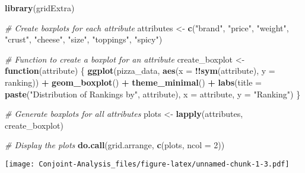 \documentclass[
]{article}
\newenvironment{Shaded}{\begin{snugshade}}{\end{snugshade}}
\newcommand{\AttributeTok}[1]{\textcolor[rgb]{0.13,0.29,0.53}{#1}}
\newcommand{\CommentTok}[1]{\textcolor[rgb]{0.56,0.35,0.01}{\textit{#1}}}
\newcommand{\ControlFlowTok}[1]{\textcolor[rgb]{0.13,0.29,0.53}{\textbf{#1}}}
\newcommand{\DecValTok}[1]{\textcolor[rgb]{0.00,0.00,0.81}{#1}}
\newcommand{\FunctionTok}[1]{\textcolor[rgb]{0.13,0.29,0.53}{\textbf{#1}}}
\newcommand{\NormalTok}[1]{#1}
\newcommand{\OtherTok}[1]{\textcolor[rgb]{0.56,0.35,0.01}{#1}}
\newcommand{\SpecialCharTok}[1]{\textcolor[rgb]{0.81,0.36,0.00}{\textbf{#1}}}
\newcommand{\StringTok}[1]{\textcolor[rgb]{0.31,0.60,0.02}{#1}}
\begin{document}
\begin{Shaded}
\begin{Highlighting}[]
\FunctionTok{library}\NormalTok{(gridExtra)}

\CommentTok{\# Create boxplots for each attribute}
\NormalTok{attributes }\OtherTok{\textless{}{-}} \FunctionTok{c}\NormalTok{(}\StringTok{"brand"}\NormalTok{, }\StringTok{"price"}\NormalTok{, }\StringTok{"weight"}\NormalTok{, }\StringTok{"crust"}\NormalTok{, }\StringTok{"cheese"}\NormalTok{, }\StringTok{"size"}\NormalTok{, }\StringTok{"toppings"}\NormalTok{, }\StringTok{"spicy"}\NormalTok{)}

\CommentTok{\# Function to create a boxplot for an attribute}
\NormalTok{create\_boxplot }\OtherTok{\textless{}{-}} \ControlFlowTok{function}\NormalTok{(attribute) \{}
  \FunctionTok{ggplot}\NormalTok{(pizza\_data, }\FunctionTok{aes}\NormalTok{(}\AttributeTok{x =} \SpecialCharTok{!!}\FunctionTok{sym}\NormalTok{(attribute), }\AttributeTok{y =}\NormalTok{ ranking)) }\SpecialCharTok{+}
    \FunctionTok{geom\_boxplot}\NormalTok{() }\SpecialCharTok{+}
    \FunctionTok{theme\_minimal}\NormalTok{() }\SpecialCharTok{+}
    \FunctionTok{labs}\NormalTok{(}\AttributeTok{title =} \FunctionTok{paste}\NormalTok{(}\StringTok{"Distribution of Rankings by"}\NormalTok{, attribute), }\AttributeTok{x =}\NormalTok{ attribute, }\AttributeTok{y =} \StringTok{"Ranking"}\NormalTok{)}
\NormalTok{\}}

\CommentTok{\# Generate boxplots for all attributes}
\NormalTok{plots }\OtherTok{\textless{}{-}} \FunctionTok{lapply}\NormalTok{(attributes, create\_boxplot)}

\CommentTok{\# Display the plots}
\FunctionTok{do.call}\NormalTok{(grid.arrange, }\FunctionTok{c}\NormalTok{(plots, }\AttributeTok{ncol =} \DecValTok{2}\NormalTok{))}
\end{Highlighting}
\end{Shaded}

\texttt{[image: Conjoint-Analysis\_files/figure-latex/unnamed-chunk-1-3.pdf]}
\end{document}
